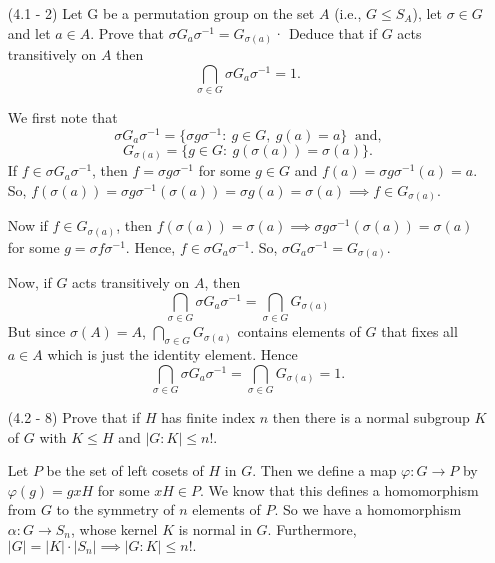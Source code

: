\documentclass[12pt]{article}
\begin{document}
\begin{enumerate}
\item[(4.1 - 2)] Let G be a permutation group on the
    set $A$ (i.e., $G\leq S_A$), let $\sigma\in G$ and
    let $a\in A$. Prove that $\sigma G_a \sigma^{-1}
    = G_{\sigma(a)}$·
    Deduce that if $G$ acts transitively on $A$ then
    $$\bigcap_{\sigma\in G}{\sigma G_a \sigma^{-1}}=1.$$
\begin{mybox}
     
    We first note that
    $$\sigma G_a \sigma^{-1}
    = \{\sigma g\sigma^{-1}:\ g\in G,\ g(a)=a\}
    \ \text{ and,}$$
    $$G_{\sigma(a)}
    = \{g\in G:\ g(\sigma(a))=\sigma(a)\}.$$
    If $f\in \sigma G_a \sigma^{-1}$, then
    $f=\sigma g \sigma^{-1}$ for some $g\in G$ and
    $f(a)=\sigma g \sigma^{-1}(a)=a.$
    So, $f(\sigma(a))=\sigma g \sigma^{-1}
    (\sigma(a))=\sigma g(a)=\sigma(a)
    \implies f\in G_{\sigma(a)}$.

    \vspace*{3mm}
    Now if $f\in G_{\sigma(a)}$, then
    $f(\sigma(a))=\sigma(a)\implies \sigma g
    \sigma^{-1} (\sigma(a))=\sigma(a)$ for some
    $g=\sigma f
    \sigma^{-1}$. Hence, $f\in \sigma G_a \sigma^{-1}$.
    So, $\sigma G_a \sigma^{-1}
    = G_{\sigma(a)}$.

    \vspace*{3mm}
    Now, if $G$ acts transitively on $A$, then
    $$\bigcap_{\sigma\in G}{\sigma G_a \sigma^{-1}}
    =\bigcap_{\sigma\in G}{G_{\sigma(a)}}
    $$
    But since $\sigma{(A)}=A$, $\bigcap_{\sigma\in G}{G_{\sigma(a)}}
    $ contains elements of $G$ that fixes all $a\in A$
    which is just the identity element.
    Hence 
    $$\bigcap_{\sigma\in G}{\sigma G_a \sigma^{-1}}
    =\bigcap_{\sigma\in G}{G_{\sigma(a)}}=1.
    $$
\end{mybox}

\item[(4.2 - 8)] Prove that if $H$ has finite index $n$
    then there is a normal subgroup $K$ of $G$ with
    $K\leq H$ and $|G:K|\leq n!$.
\begin{mybox}

    Let $P$ be the set of left cosets of $H$ in $G$.
    Then we define a map $\varphi:
    G\to P$ by $\varphi(g)=gxH$ for some $xH\in P$.
    We know that this defines a homomorphism from
    $G$ to the symmetry of $n$ elements of $P$.
    So we have a homomorphism $\alpha:G\to
    S_n$, whose kernel $K$
    is normal in $G$. Furthermore,
    $|G|=|K|\cdot|S_n|\implies |G:K|\leq n!.$

\end{mybox}


\end{enumerate}
\end{document}
